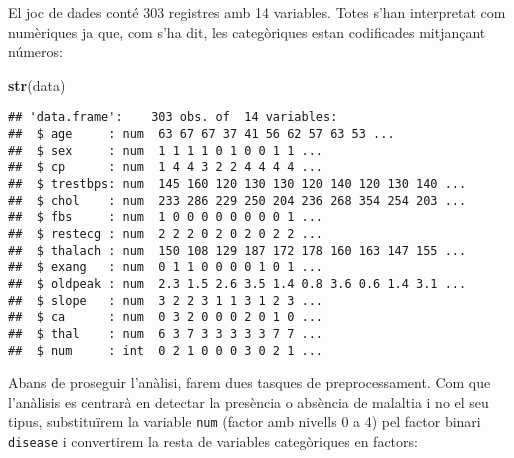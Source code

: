 \documentclass[12,]{article}
\newenvironment{Shaded}{\begin{snugshade}}{\end{snugshade}}
\newcommand{\ControlFlowTok}[1]{\textcolor[rgb]{0.13,0.29,0.53}{\textbf{#1}}}
\newcommand{\DecValTok}[1]{\textcolor[rgb]{0.00,0.00,0.81}{#1}}
\newcommand{\KeywordTok}[1]{\textcolor[rgb]{0.13,0.29,0.53}{\textbf{#1}}}
\newcommand{\NormalTok}[1]{#1}
\newcommand{\OperatorTok}[1]{\textcolor[rgb]{0.81,0.36,0.00}{\textbf{#1}}}
\newcommand{\OtherTok}[1]{\textcolor[rgb]{0.56,0.35,0.01}{#1}}
\newcommand{\StringTok}[1]{\textcolor[rgb]{0.31,0.60,0.02}{#1}}
\begin{document}
El joc de dades conté 303 registres amb 14 variables. Totes s'han
interpretat com numèriques ja que, com s'ha dit, les categòriques estan
codificades mitjançant números:

\begin{Shaded}
\begin{Highlighting}[]
\KeywordTok{str}\NormalTok{(data)}
\end{Highlighting}
\end{Shaded}

\begin{verbatim}
## 'data.frame':    303 obs. of  14 variables:
##  $ age     : num  63 67 67 37 41 56 62 57 63 53 ...
##  $ sex     : num  1 1 1 1 0 1 0 0 1 1 ...
##  $ cp      : num  1 4 4 3 2 2 4 4 4 4 ...
##  $ trestbps: num  145 160 120 130 130 120 140 120 130 140 ...
##  $ chol    : num  233 286 229 250 204 236 268 354 254 203 ...
##  $ fbs     : num  1 0 0 0 0 0 0 0 0 1 ...
##  $ restecg : num  2 2 2 0 2 0 2 0 2 2 ...
##  $ thalach : num  150 108 129 187 172 178 160 163 147 155 ...
##  $ exang   : num  0 1 1 0 0 0 0 1 0 1 ...
##  $ oldpeak : num  2.3 1.5 2.6 3.5 1.4 0.8 3.6 0.6 1.4 3.1 ...
##  $ slope   : num  3 2 2 3 1 1 3 1 2 3 ...
##  $ ca      : num  0 3 2 0 0 0 2 0 1 0 ...
##  $ thal    : num  6 3 7 3 3 3 3 3 7 7 ...
##  $ num     : int  0 2 1 0 0 0 3 0 2 1 ...
\end{verbatim}

Abans de proseguir l'anàlisi, farem dues tasques de preprocessament. Com
que l'anàlisis es centrarà en detectar la presència o absència de
malaltia i no el seu tipus, substituïrem la variable \texttt{num}
(factor amb nivells 0 a 4) pel factor binari \texttt{disease} i
convertirem la resta de variables categòriques en factors:

\begin{Shaded}
\end{Shaded}
\end{document}
